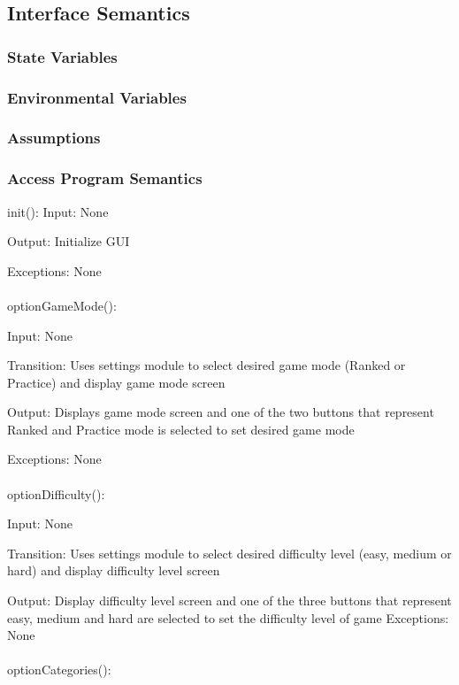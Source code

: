 \documentclass[12,english]{article}
\begin{document}
		\subsection{Interface Semantics}
		\subsubsection{State Variables}
		\subsubsection{Environmental Variables}
		\subsubsection{Assumptions}
		
		\subsubsection{Access Program Semantics}
		
		init():
		Input: None
		
		Output: Initialize GUI 
		
		Exceptions: None\\
		\\
	    optionGameMode():
		
		Input: None
		
		Transition: Uses settings module to select desired game mode (Ranked or Practice) and display game mode screen

		Output: Displays game mode screen and one of the two buttons that represent Ranked and Practice mode is selected to set desired game mode
		
		Exceptions: None\\
		\\
		optionDifficulty():
		
		Input: None
		
		Transition: Uses settings module to select desired difficulty level (easy, medium or hard) and display difficulty level screen

		Output: Display difficulty level screen and one of the three buttons that represent easy, medium and hard are selected to set the difficulty level of game 
		Exceptions: None\\
		\\
		optionCategories():
		
\end{document}
